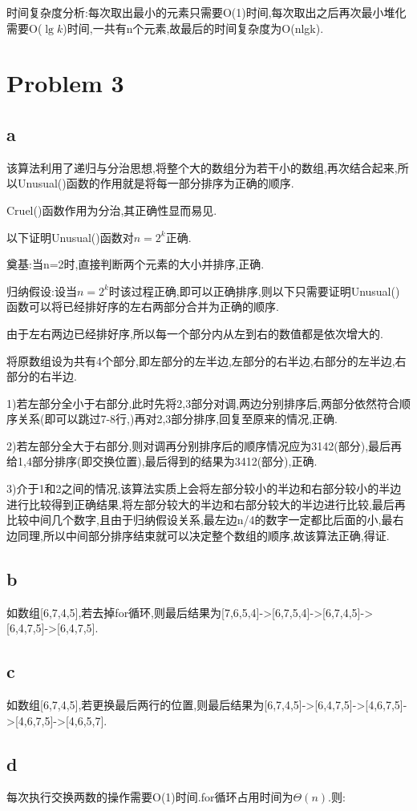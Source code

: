 \documentclass[12pt,a4paper,fontset=none]{ctexart}
\begin{document}
时间复杂度分析:每次取出最小的元素只需要O(1)时间,每次取出之后再次最小堆化需要O($\lg k$)时间,一共有n个元素,故最后的时间复杂度为O(nlgk).
\section*{Problem 3}
\subsection*{a}
该算法利用了递归与分治思想,将整个大的数组分为若干小的数组,再次结合起来,所以Unusual()函数的作用就是将每一部分排序为正确的顺序.

Cruel()函数作用为分治,其正确性显而易见.

以下证明Unusual()函数对$n=2^k$正确.

奠基:当n=2时,直接判断两个元素的大小并排序,正确.

归纳假设:设当$n=2^k$时该过程正确,即可以正确排序,则以下只需要证明Unusual()函数可以将已经排好序的左右两部分合并为正确的顺序.

由于左右两边已经排好序,所以每一个部分内从左到右的数值都是依次增大的.

将原数组设为共有4个部分,即左部分的左半边,左部分的右半边,右部分的左半边,右部分的右半边.

1)若左部分全小于右部分,此时先将2,3部分对调,两边分别排序后,两部分依然符合顺序关系(即可以跳过7-8行,)再对2,3部分排序,回复至原来的情况,正确.

2)若左部分全大于右部分,则对调再分别排序后的顺序情况应为3142(部分),最后再给1,4部分排序(即交换位置),最后得到的结果为3412(部分),正确.

3)介于1和2之间的情况,该算法实质上会将左部分较小的半边和右部分较小的半边进行比较得到正确结果,将左部分较大的半边和右部分较大的半边进行比较,最后再比较中间几个数字,且由于归纳假设关系,最左边n/4的数字一定都比后面的小,最右边同理,所以中间部分排序结束就可以决定整个数组的顺序,故该算法正确,得证.
\subsection*{b}
如数组[6,7,4,5],若去掉for循环,则最后结果为[7,6,5,4]->[6,7,5,4]->[6,7,4,5]->[6,4,7,5]->[6,4,7,5].
\subsection*{c}
如数组[6,7,4,5],若更换最后两行的位置,则最后结果为[6,7,4,5]->[6,4,7,5]->[4,6,7,5]->[4,6,7,5]->[4,6,5,7].
\subsection*{d}
每次执行交换两数的操作需要O(1)时间.for循环占用时间为$\Theta (n)$.则:
\end{document}
